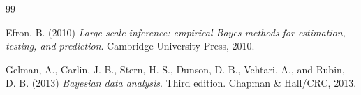 \documentclass{scrartcl}
\begin{document}
\begin{thebibliography}{99}

  

Efron, B. (2010)
\textit{Large-scale inference: empirical Bayes methods for estimation,
testing, and prediction}. Cambridge University Press, 2010.

Gelman, A., Carlin, J. B., Stern, H. S., Dunson, D. B., Vehtari, A., and Rubin, D. B. (2013)
\textit{Bayesian data analysis}. Third edition. Chapman \& Hall/CRC, 2013.








\end{thebibliography}
\end{document}
